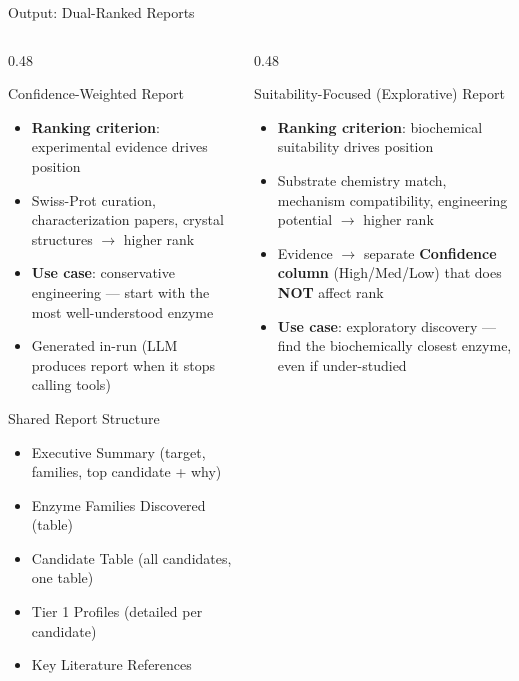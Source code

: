 \documentclass[aspectratio=169, 11pt]{beamer}
\begin{document}
\begin{frame}{Output: Dual-Ranked Reports}
\vspace{-4pt}
\begin{columns}[T]
\begin{column}{0.48\textwidth}

\begin{block}{\small Confidence-Weighted Report}
\vspace{-2pt}
\begin{itemize}\scriptsize
\setlength\itemsep{1pt}
\item \textbf{Ranking criterion}: experimental evidence drives position
\item Swiss-Prot curation, characterization papers, crystal structures $\rightarrow$ higher rank
\item \textbf{Use case}: conservative engineering --- start with the most well-understood enzyme
\item Generated in-run (LLM produces report when it stops calling tools)
\end{itemize}
\end{block}

\begin{exampleblock}{\small Shared Report Structure}
\vspace{-2pt}
\begin{itemize}\scriptsize
\setlength\itemsep{0pt}
\item Executive Summary (target, families, top candidate + why)
\item Enzyme Families Discovered (table)
\item Candidate Table (all candidates, one table)
\item Tier 1 Profiles (detailed per candidate)
\item Key Literature References
\end{itemize}
\end{exampleblock}

\end{column}
\begin{column}{0.48\textwidth}

\begin{alertblock}{\small Suitability-Focused (Explorative) Report}
\vspace{-2pt}
\begin{itemize}\scriptsize
\setlength\itemsep{1pt}
\item \textbf{Ranking criterion}: biochemical suitability drives position
\item Substrate chemistry match, mechanism compatibility, engineering potential $\rightarrow$ higher rank
\item Evidence $\rightarrow$ separate \textbf{Confidence column} (High/Med/Low) that does \textbf{NOT} affect rank
\item \textbf{Use case}: exploratory discovery --- find the biochemically closest enzyme, even if under-studied
\end{itemize}
\end{alertblock}


\end{column}
\end{columns}
\end{frame}
\end{document}
